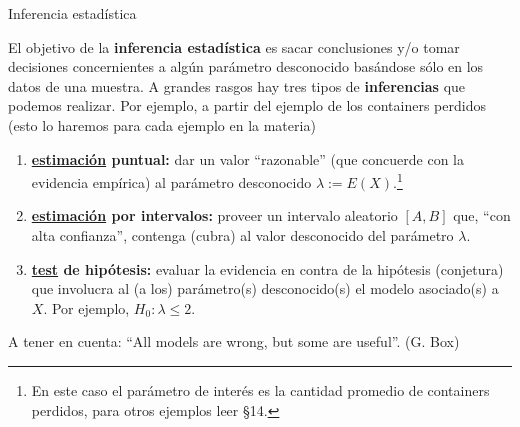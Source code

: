 \documentclass{beamer}
\theoremstyle{definition}
\begin{document}
\begin{frame}{\color{rosee}Inferencia estad\'istica}\small
  \begin{block}{}
    El objetivo de la \textbf{inferencia estad\'istica} es sacar conclusiones y/o
    tomar decisiones concernientes a alg\'un par\'ametro desconocido
    bas\'andose s\'olo en los datos de una muestra. A grandes rasgos hay
    tres tipos de \textbf{inferencias} que podemos realizar. Por ejemplo, a partir del ejemplo de los containers perdidos (esto lo haremos para cada ejemplo en la materia)
    
    \begin{enumerate}
    \item \color{blue}\textbf{\underline{estimaci\'on} puntual:} \color{black}dar un valor ``razonable'' (que concuerde con la evidencia empírica) al parámetro desconocido $\lambda:=E(X)$.\footnote{En este caso el parámetro de inter\'es es la cantidad promedio de containers perdidos, para otros ejemplos leer \S14.}
    \item \color{red}\textbf{\underline{estimaci\'on} por intervalos:} \color{black}proveer un intervalo aleatorio $[A,B]$ que, ``con alta confianza'', contenga (cubra) al valor desconocido del parámetro $\lambda$.
    \item \color{deepyellow}\textbf{\underline{test} de hip\'otesis:} \color{black} evaluar la evidencia en contra
      de la hip\'otesis (conjetura) que involucra al (a los) parámetro(s) desconocido(s) el modelo asociado(s) a $X$. Por ejemplo, $H_0: \lambda \leqslant 2$.
    \end{enumerate}
  \end{block}
  
  
A tener en cuenta: ``All models are wrong, but some are useful''. (G. Box)
\end{frame}
\end{document}
